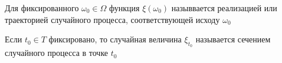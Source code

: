 \begin{definition}
  Для фиксированного $\omega_0 \in \Omega$ функция $\xi\left( \omega_0 \right)$
  назыввается реализацией или траекторией случайного процесса, соответствующей
  исходу $\omega_0$
\end{definition}

\begin{definition}
  Если $t_0 \in T$ фиксировано, то случайная величина $\xi_{t_0}$ называется
  сечением случайного процесса в точке $t_0$
\end{definition}
